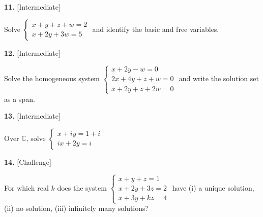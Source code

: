 \documentclass[11pt]{article}
\begin{document}
\begin{minipage}{\linewidth}\textbf{11.} \hfill{\scriptsize\color{ink}[Intermediate]}\par\nopagebreak Solve $\begin{cases}x+y+z+w=2\\ x+2y+3w=5\end{cases}$ and identify the basic and free variables.
\vspace{3.8cm}\end{minipage}\par\vspace{4pt}
\begin{minipage}{\linewidth}\textbf{12.} \hfill{\scriptsize\color{ink}[Intermediate]}\par\nopagebreak Solve the homogeneous system $\begin{cases}x+2y-w=0\\ 2x+4y+z+w=0\\ x+2y+z+2w=0\end{cases}$ and write the solution set as a span.
\vspace{4.1cm}\end{minipage}\par\vspace{4pt}
\begin{minipage}{\linewidth}\textbf{13.} \hfill{\scriptsize\color{ink}[Intermediate]}\par\nopagebreak Over $\mathbb{C}$, solve $\begin{cases}x+iy=1+i\\ ix+2y=i\end{cases}$
\vspace{3.8cm}\end{minipage}\par\vspace{4pt}
\begin{minipage}{\linewidth}\textbf{14.} \hfill{\scriptsize\color{ink}[Challenge]}\par\nopagebreak For which real $k$ does the system $\begin{cases}x+y+z=1\\ x+2y+3z=2\\ x+3y+kz=4\end{cases}$ have (i) a unique solution, (ii) no solution, (iii) infinitely many solutions?
\vspace{4.6cm}\end{minipage}\par\vspace{4pt}
\end{document}
